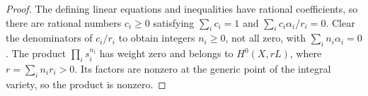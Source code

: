 \begin{proof}
The defining linear equations and inequalities have rational
coefficients, so there are rational numbers $c_i\ge0$ satisfying
$\sum_i c_i=1$ and $\sum_i c_i\alpha_i/r_i=0$.  Clear the
denominators of $c_i/r_i$ to obtain integers $n_i\ge0$, not all
zero, with $\sum_i n_i\alpha_i=0$.  The product
$\prod_i s_i^{n_i}$ has weight zero and belongs to
$H^0(X,rL)$, where $r=\sum_i n_i r_i>0$.  Its factors are
nonzero at the generic point of the integral variety, so the
product is nonzero.
\end{proof}
